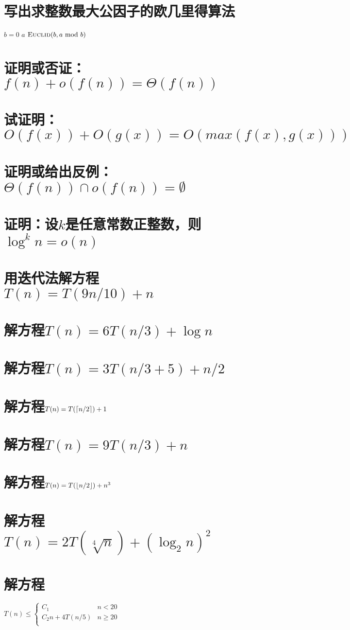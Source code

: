 \documentclass{article}
\DeclarePairedDelimiter{\ceil}{\lceil}{\rceil}
\DeclarePairedDelimiter{\floor}{\lfloor}{\rfloor}
\begin{document}
\section{写出求整数最大公因子的欧几里得算法}
\large {
\begin{codebox}
  \li \If $b = 0$
  \li  \Then  \Return $a$
  \li \ElseNoIf \Return $\textnormal{\scshape Euclid}(b, a\  \text{mod}\  b)$
      \End
\end{codebox}
}

\section{证明或否证：$f(n)+o(f(n))=\Theta(f(n))$}

\section{试证明：$O(f(x))+O(g(x))=O(max(f(x), g(x)))$}

\section{证明或给出反例：$\Theta(f(n)) \cap o(f(n)) = \emptyset $}

\section{证明：设$k$是任意常数正整数，则$\log^kn=o(n)$}

\section{用迭代法解方程$T(n)=T(9n/10)+n$}

\section{解方程$T(n)=6T(n/3)+\log n$}

\section{解方程$T(n)=3T(n/3+5)+n/2$}

\section{解方程$T(n)=T(\ceil {n/2})+1$}

\section{解方程$T(n)=9T(n/3)+n$}

\section{解方程$T(n)=T(\floor {n/2})+n^3$}

\section{解方程$T(n)=2T(\sqrt[4]n)+(\log_2n)^2$}


\section{解方程}
\large {
  $
  T(n) \leq \begin{cases}
    C_1 & n < 20\\
    C_2n+4T(n/5) & n \geq 20\\
  \end{cases}
  $
}
\end{document}
